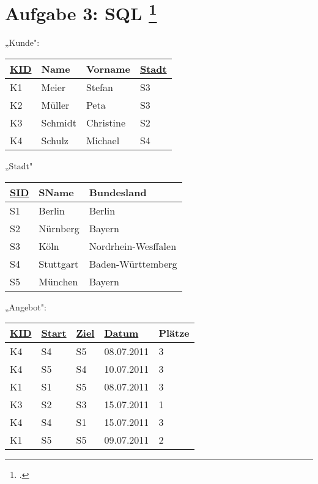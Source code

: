 \documentclass{lehramt-informatik-minimal}
\def\TmpUeber#1{{\setul{-0.9em}{}\ul{#1}}}
\begin{document}
%

\section{Aufgabe 3: SQL
\footcite[Thema 2 Aufgabe 3]{examen:46116:2014:03}
}

{
\footnotesize
\begin{multicols}{2}
„Kunde":

\begin{tabular}{|l|l|l|l|}
\hline
\ul{KID} & Name & Vorname & \TmpUeber{Stadt}\\\hline\hline
K1 & Meier & Stefan & S3\\\hline
K2 & Müller & Peta & S3\\\hline
K3 & Schmidt & Christine & S2\\\hline
K4 & Schulz & Michael & S4\\\hline
\end{tabular}

„Stadt"

\begin{tabular}{|l|l|l|}
\hline
\ul{SID} & SName & Bundesland\\\hline\hline
S1 & Berlin & Berlin\\\hline
S2 & Nürnberg & Bayern\\\hline
S3 & Köln & Nordrhein-Wesffalen\\\hline
S4 & Stuttgart & Baden-Württemberg\\\hline
S5 & München & Bayern\\\hline
\end{tabular}
\end{multicols}

\begin{multicols}{2}
„Angebot":

\begin{tabular}{|l|l|l|l|l|}
\hline
\ul{KID} & \TmpUeber{Start} & \TmpUeber{Ziel} & \ul{Datum} & Plätze\\\hline\hline
K4 & S4 & S5 & 08.07.2011 & 3\\\hline
K4 & S5 & S4 & 10.07.2011 & 3\\\hline
K1 & S1 & S5 & 08.07.2011 & 3\\\hline
K3 & S2 & S3 & 15.07.2011 & 1\\\hline
K4 & S4 & S1 & 15.07.2011 & 3\\\hline
K1 & S5 & S5 & 09.07.2011 & 2\\\hline
\end{tabular}


\end{multicols}}
\end{document}
